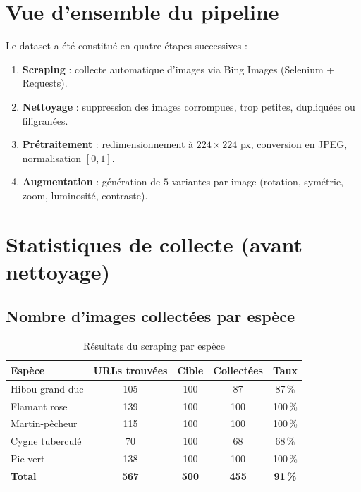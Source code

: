 \documentclass[12pt,a4paper]{article}
\begin{document}
\section{Vue d'ensemble du pipeline}

Le dataset a été constitué en quatre étapes successives :

\begin{enumerate}[label=\textbf{\arabic*.}]
  \item \textbf{Scraping} : collecte automatique d'images via Bing Images (Selenium + Requests).
  \item \textbf{Nettoyage} : suppression des images corrompues, trop petites, dupliquées ou filigranées.
  \item \textbf{Prétraitement} : redimensionnement à $224\times224$ px, conversion en JPEG, normalisation $[0,1]$.
  \item \textbf{Augmentation} : génération de $5$ variantes par image (rotation, symétrie, zoom, luminosité, contraste).
\end{enumerate}

\section{Statistiques de collecte (avant nettoyage)}

\subsection{Nombre d'images collectées par espèce}

\begin{table}[h!]
  \centering
  \caption{Résultats du scraping par espèce}
  \label{tab:scraping}
  \begin{tabular}{lcccc}
    \toprule
    \textbf{Espèce} & \textbf{URLs trouvées} & \textbf{Cible} & \textbf{Collectées} & \textbf{Taux} \\
    \midrule
    Hibou grand-duc  & 105 & 100 &  87 & 87\,\% \\
    Flamant rose     & 139 & 100 & 100 & 100\,\% \\
    Martin-pêcheur   & 115 & 100 & 100 & 100\,\% \\
    Cygne tuberculé  &  70 & 100 &  68 & 68\,\% \\
    Pic vert         & 138 & 100 & 100 & 100\,\% \\
    \midrule
    \textbf{Total}   & \textbf{567} & \textbf{500} & \textbf{455} & \textbf{91\,\%} \\
    \bottomrule
  \end{tabular}
\end{table}
\end{document}
